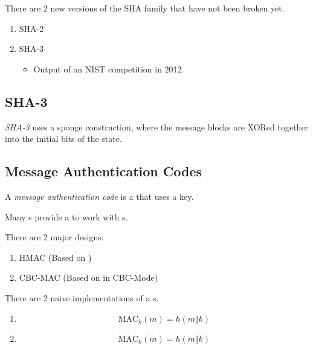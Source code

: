 There are 2 new versions of the SHA family that have not been broken yet.
\begin{enumerate}[noitemsep]
\item SHA-2
\item SHA-3
  \begin{itemize}[noitemsep]
  \item Output of an NIST competition in 2012.
  \end{itemize}
\end{enumerate}

\subsection{SHA-3}\label{subsec:SHA_3}
\begin{definition}[SHA-3]\label{def:SHA_3}
  \emph{SHA-3} uses a sponge construction, where the message blocks are XORed together into the initial bits of the state.
\end{definition}

\subsection{Message Authentication Codes}\label{subsec:MACs}
\begin{definition}\label{def:MAC}
  A \emph{message authentication code} is a  that uses a key.

  \begin{remark}\label{rmk:MAC_Block_Cipher_Relation}
    Many s provide a  to work with s.
  \end{remark}
\end{definition}

There are 2 major designs:
\begin{enumerate}[noitemsep]
\item HMAC (Based on )
\item CBC-MAC (Based on  in CBC-Mode)
\end{enumerate}

There are 2 na\"{\i}ve implementations of a s.
\begin{enumerate}[noitemsep]
\item
  \begin{equation*}
    \text{MAC}_{k}(m) = h(m \Vert k)
  \end{equation*}
\item
  \begin{equation*}
    \text{MAC}_{k}(m) = h(m \Vert k)
  \end{equation*}
\end{enumerate}

